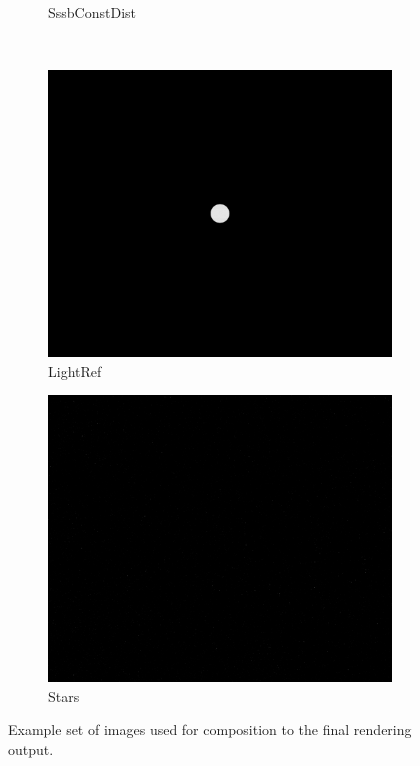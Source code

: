 \begin{figure}[htb]
\begin{subfigure}[b]{0.47\textwidth}
        \caption{SssbConstDist}
        \label{fig:comp_sssbconstdist}
    \end{subfigure}
    \\
    \begin{subfigure}[b]{0.47\textwidth}
        \centering
        \includegraphics[width=\textwidth]{doc/thesis/0_figures/composition/LightRef_2017-08-15T115855-684000.png}
        \caption{LightRef}
        \label{fig:comp_lightref}
    \end{subfigure}
    \begin{subfigure}[b]{0.47\textwidth}
        \centering
        \includegraphics[width=\textwidth]{doc/thesis/0_figures/composition/Stars_2017-08-15T115855-684000.png}
        \caption{Stars}
        \label{fig:comp_stars}
    \end{subfigure}
    \caption{Example set of images used for composition to the final rendering output.}
    \label{fig:comp_imageset}
\end{figure}

